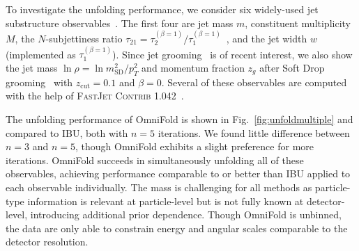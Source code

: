 \documentclass[prl,twocolumn,superscriptaddress,longbibliography,preprintnumbers,nofootinbib]{revtex4-1}
\DeclareRobustCommand{\Fig}[1]{Fig.~\ref{fig:#1}}
\newcommand{\OmniFold}{{\sc OmniFold}\xspace}
\begin{document}
To investigate the unfolding performance, we consider six widely-used jet substructure observables~\cite{Larkoski:2017jix}.
%
The first four are jet mass $m$, constituent multiplicity $M$, the $N$-subjettiness ratio $\tau_{21}=\tau_2^{(\beta=1)}/\tau_1^{(\beta=1)}$~\cite{Thaler:2010tr,Thaler:2011gf}, and the jet width $w$ (implemented as $\tau_1^{(\beta=1)}$).
%
Since jet grooming~\cite{Krohn:2009th,Ellis:2009me,Ellis:2009su,Dasgupta:2013ihk,Larkoski:2014wba} is of recent interest, we also show the jet mass $\ln\rho = \ln m_\text{SD}^2/p_T^2$ and momentum fraction $z_g$ after Soft Drop grooming~\cite{Larkoski:2014wba,Dasgupta:2013ihk} with $z_\text{cut}=0.1$ and $\beta=0$.
%
Several of these observables are computed with the help of \textsc{FastJet Contrib 1.042}~\cite{fjcontrib}.


The unfolding performance of \OmniFold is shown in \Fig{unfoldmultiple} and compared to IBU, both with $n=5$ iterations.
%
We found little difference between $n=3$ and $n=5$, though \OmniFold exhibits a slight preference for more iterations.
%
\OmniFold succeeds in simultaneously unfolding all of these observables, achieving performance comparable to or better than IBU applied to each observable individually.
%
The mass is challenging for all methods as particle-type information is relevant at particle-level but is not fully known at detector-level, introducing additional prior dependence.
%
Though \OmniFold is unbinned, the data are only able to constrain energy and angular scales comparable to the detector resolution.
\end{document}
